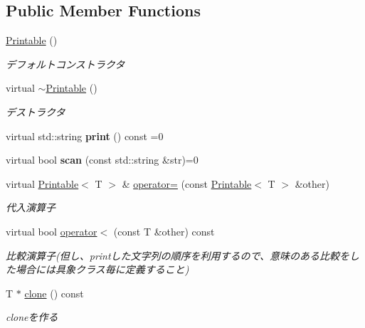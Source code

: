 \subsection*{Public Member Functions}
\begin{DoxyCompactItemize}
\item 
\hypertarget{classskl_1_1_printable_ab1d9cf680b6431052ca4692aaef1f106}{}\label{classskl_1_1_printable_ab1d9cf680b6431052ca4692aaef1f106} 
\hyperlink{classskl_1_1_printable_ab1d9cf680b6431052ca4692aaef1f106}{Printable} ()
\begin{DoxyCompactList}\small\item\em デフォルトコンストラクタ \end{DoxyCompactList}\item 
\hypertarget{classskl_1_1_printable_ad299a8e5955a80154aa656d178a9992e}{}\label{classskl_1_1_printable_ad299a8e5955a80154aa656d178a9992e} 
virtual \hyperlink{classskl_1_1_printable_ad299a8e5955a80154aa656d178a9992e}{$\sim$\+Printable} ()
\begin{DoxyCompactList}\small\item\em デストラクタ \end{DoxyCompactList}\item 
\hypertarget{classskl_1_1_printable_ad27d5ef1bb67b50e89db983d106cc9d1}{}\label{classskl_1_1_printable_ad27d5ef1bb67b50e89db983d106cc9d1} 
virtual std\+::string {\bfseries print} () const =0
\item 
\hypertarget{classskl_1_1_printable_a7f99b93dcf3250ac0861f2660103f8a8}{}\label{classskl_1_1_printable_a7f99b93dcf3250ac0861f2660103f8a8} 
virtual bool {\bfseries scan} (const std\+::string \&str)=0
\item 
\hypertarget{classskl_1_1_printable_a72ab64dc61dbecebef3211b72814f978}{}\label{classskl_1_1_printable_a72ab64dc61dbecebef3211b72814f978} 
virtual \hyperlink{classskl_1_1_printable}{Printable}$<$ T $>$ \& \hyperlink{classskl_1_1_printable_a72ab64dc61dbecebef3211b72814f978}{operator=} (const \hyperlink{classskl_1_1_printable}{Printable}$<$ T $>$ \&other)
\begin{DoxyCompactList}\small\item\em 代入演算子 \end{DoxyCompactList}\item 
\hypertarget{classskl_1_1_printable_a57ee1e53f47772b771f41e1b23ee5b82}{}\label{classskl_1_1_printable_a57ee1e53f47772b771f41e1b23ee5b82} 
virtual bool \hyperlink{classskl_1_1_printable_a57ee1e53f47772b771f41e1b23ee5b82}{operator$<$} (const T \&other) const
\begin{DoxyCompactList}\small\item\em 比較演算子(但し、printした文字列の順序を利用するので、意味のある比較をした場合には具象クラス毎に定義すること) \end{DoxyCompactList}\item 
T $\ast$ \hyperlink{classskl_1_1_printable_a1bc18e234d25c4bdce84ed70a58d2f88}{clone} () const
\begin{DoxyCompactList}\small\item\em cloneを作る \end{DoxyCompactList}\end{DoxyCompactItemize}
